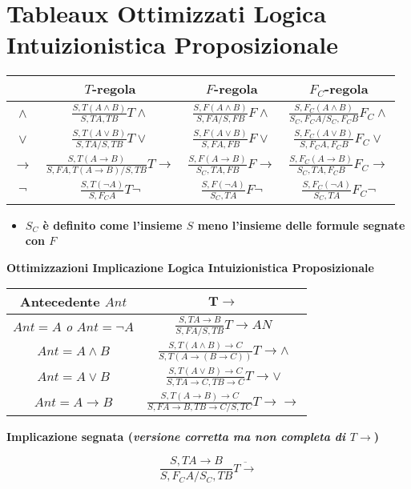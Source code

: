 \documentclass[a4paper,12pt, oneside]{book}
\begin{document}
\section*{Tableaux Ottimizzati Logica Intuizionistica Proposizionale}
\begin{table}[H]
  \Large
  \centering
  \begin{tabular}{c||c|c|c}
    & {\small{$T$-regola}}& {\small{$F$-regola}} & {\small{$F_C$-regola}}\\
    \hline
    \hline
    $\land$ & $\frac{S,T(A\land B)}{S,TA,TB}T\land$&
              $\frac{S,F(A\land B)}{S,FA/S,FB}F\land$&
              $\frac{S,F_C(A\land B)}{S_C,F_CA/S_C,F_CB}F_C\land$\\ 
    \hline
    $\lor$ & $\frac{S,T(A\lor B)}{S,TA/S,TB}T\lor$&
                        $\frac{S,F(A\lor B)}{S,FA,FB}F\lor$&
                        $\frac{S,F_C(A\lor B)}{S,F_CA,F_CB}F_C\lor$\\
    \hline
    $\to$ & $\frac{S,T(A\to B)}{S,FA, T(A\to B)/S,TB}T\to$&
                        $\frac{S,F(A\to B)}{S_C,TA,FB}F\to$&
                        $\frac{S,F_C(A\to B)}{S_C,TA,F_CB}F_C\to$\\
    \hline
    $\neg$ & $\frac{S,T(\neg A)}{S,F_CA}T\neg$&
                        $\frac{S,F(\neg A)}{S_C,TA}F\neg$&
                        $\frac{S,F_C(\neg A)}{S_C,TA}F_C\neg$\\
    \hline
  \end{tabular}
\end{table}
\begin{itemize}
  \item \textbf{$S_C$ è definito come l'insieme $S$ meno l'insieme delle formule
    segnate con $F$}
\end{itemize}
\begin{center}
  \textbf{Ottimizzazioni Implicazione Logica Intuizionistica Proposizionale}
\end{center}
\begin{table}[H]
  \Large
  \centering
  \begin{tabular}{c|c}
    Antecedente $Ant$ & $\mathbf{T\to}$\\
    \hline
    $Ant=A$ \textit{o} $Ant=\neg A$ & $\frac{S,TA\to B}{S,FA/S,TB}T\to AN$\\
    \hline
    $Ant=A\land B $ & $\frac{S,T(A\land B)\to C}{S,T(A\to(B\to C))}T\to \land$\\
    \hline
    $Ant=A\lor B$ & $\frac{S,T(A\lor B)\to C}{S,TA\to C, TB\to C}T\to \lor$\\
    \hline
    $Ant =A\to B$ & $\frac{S,T(A\to B)\to C}{S, FA\to B,TB\to C/S, TC}T\to\to$\\
    \hline
  \end{tabular}
\end{table}
\begin{center}
  \textbf{Implicazione segnata (\textit{versione corretta ma non completa di
      $T\to$})} 
\end{center}
\[\frac{S, TA\to B}{S,F_CA/S_C, TB}\overline{T\to}\]
\newpage
\end{document}
